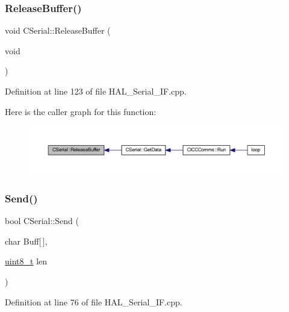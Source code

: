\subsubsection{\texorpdfstring{Release\+Buffer()}{ReleaseBuffer()}}
{\footnotesize\ttfamily void C\+Serial\+::\+Release\+Buffer (\begin{DoxyParamCaption}\item[{void}]{ }\end{DoxyParamCaption})}



Definition at line 123 of file H\+A\+L\+\_\+\+Serial\+\_\+\+I\+F.\+cpp.

Here is the caller graph for this function\+:
\nopagebreak
\begin{figure}[H]
\begin{center}
\leavevmode
\includegraphics[width=350pt]{class_c_serial_a941e5cae2ca04518925a3b32f51110a6_icgraph}
\end{center}
\end{figure}
\mbox{\label{class_c_serial_ae5bec6d6a1c75839ae02cf0069d1f08e}} 
\subsubsection{\texorpdfstring{Send()}{Send()}}
{\footnotesize\ttfamily bool C\+Serial\+::\+Send (\begin{DoxyParamCaption}\item[{char}]{Buff\mbox{[}$\,$\mbox{]},  }\item[{\mbox{\hyperlink{_a_d_a_s___types_8h_aba7bc1797add20fe3efdf37ced1182c5}{uint8\+\_\+t}}}]{len }\end{DoxyParamCaption})}



Definition at line 76 of file H\+A\+L\+\_\+\+Serial\+\_\+\+I\+F.\+cpp.

\mbox{\label{class_c_serial_a974812db5ced18cb9a6a73dc9034e7c8}} 
